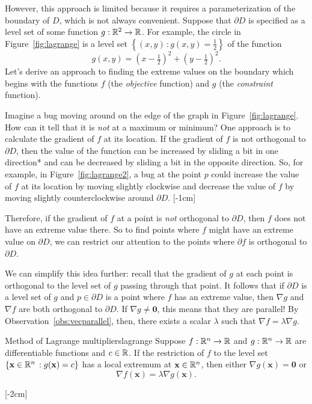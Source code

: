 \documentclass{watsonbook}
\begin{document}
  However, this approach is limited because it requires a
  parameterization of the boundary of $D$, which is not always
  convenient. Suppose that $\partial D$ is specified as a level set of
  some function $g: \mathbb{R}^2 \to \mathbb{R}$. For example, the
  circle in Figure~\ref{fig:lagrange} is a level set $\left\{(x,y) \, :
  g(x,y) = \tfrac{1}{2}\right\}$ of the function
  \[
    g(x,y) = \left(x-\tfrac{1}{2}\right)^2 + \left(y-\tfrac{1}{2}\right)^2. 
  \]
  Let's derive an approach to finding the extreme values on the
  boundary which begins with the functions $f$ (the \textit{objective}
  function) and $g$ (the \textit{constraint} function).

  
  Imagine a bug moving around on the edge of the graph in
  Figure~\ref{fig:lagrange}. How can it tell that it is \textit{not}
  at a maximum or minimum? One approach is to calculate the gradient
  of $f$ at its location. If the gradient of $f$ is not orthogonal to
  $\partial D$, then the value of the function can be increased by
  sliding a bit in one direction* and can be decreased by sliding a
  bit in the opposite direction. So, for example, in
  Figure~\ref{fig:lagrange2}, a bug at the point $p$ could increase
  the value of $f$ at its location by moving slightly clockwise and
  decrease the value of $f$ by moving slightly counterclockwise around
  $\partial D$. [-1cm]

  Therefore, if the gradient of $f$ at a point is \textit{not}
  orthogonal to $\partial D$, then $f$ does not have an extreme
  value there. So to find points where $f$ might have an extreme value
  on $\partial D$, we can restrict our attention to the points where
  $\partial f$ is orthogonal to $\partial D$.

  We can simplify this idea further: recall that the gradient of $g$
  at each point is orthogonal to the level set of $g$ passing through
  that point. It follows that if $\partial D$ is a level set of $g$
  and $p \in \partial D$ is a point where $f$ has an extreme value,
  then $\nabla g$ and $\nabla f$ are both orthogonal to $\partial
  D$. If $\nabla g \neq \mathbf{0}$, this means that they are parallel! By
  Observation~\ref{obs:vecparallel}, then, there exists a scalar
  $\lambda$ such that $\nabla f = \lambda \nabla g$.

  \begin{theo}{Method of Lagrange multipliers}{lagrange}
    Suppose $f: \mathbb{R}^n \to \mathbb{R}$ and $g:\mathbb{R}^n \to \mathbb{R}$ are differentiable
    functions and $c \in \mathbb{R}$. If the restriction of $f$ to the level
    set $\{\mathbf{x} \in \mathbb{R}^n \,: g(\mathbf{x}) = c\}$ has a local
    extremum at $\mathbf{x} \in \mathbb{R}^n$, then either $\nabla g(\mathbf{x}) =
    \mathbf{0}$ or 
    \[
      \nabla f (\mathbf{x}) = \lambda \nabla g (\mathbf{x}). 
    \]
  \end{theo} [-2cm]
\end{document}
